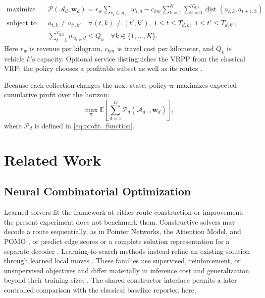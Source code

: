 \documentclass[orivec,runningheads]{llncs}
\DeclareMathOperator*{\dist}{dist}
\begin{document}
\begin{equation}
\begin{aligned}
    \textrm{maximize} \quad & \mathcal{P}(\mathcal{A}_d, \bm{w}_d) = r_w \sum_{v_i\in\mathcal{A}_{d,\cdot}}w_{i,d}
    -c_{km}\sum_{k=1}^{K}\sum_{t=0}^{T_{d,k}}
    \dist(a_{t,k},a_{t+1,k}) \label{eq:profit_function}\\
    \textrm{subject to} \quad
    & a_{t,k}\neq a_{t',k'} \quad
      \forall (t,k)\neq(t',k'),\ 1\leq t\leq T_{d,k},\ 1\leq t'\leq T_{d,k'},\\
    & \sum_{t=1}^{T_{d,k}}w_{a_{t,k},d}\leq Q_k
      \quad \forall k\in\{1,\ldots,K\}.
\end{aligned}
\end{equation}
Here $r_w$ is revenue per kilogram, $c_{km}$ is travel cost per kilometer, and $Q_k$ is vehicle $k$'s capacity. Optional service distinguishes the VRPP from
the classical VRP: the policy chooses a profitable subset as well as its routes \cite{doi:10.1137/1.9781611973594.ch10}.

Because each collection changes the next state, policy $\bm{\pi}$ maximizes
expected cumulative profit over the horizon:
\begin{equation}
    \max_{\bm{\pi}} \mathbb{E} \left[ \sum_{d=1}^D \mathcal{P}_d(\mathcal{A}_{d,\cdot}, \bm{w}_d) \right],
\end{equation}
where $\mathcal{P}_d$ is defined in \eqref{eq:profit_function}.



\section{Related Work}
\subsection{Neural Combinatorial Optimization}
Learned solvers fit the framework at either route construction or improvement;
the present experiment does not benchmark them. Constructive solvers may decode
a route sequentially, as in Pointer Networks, the Attention Model, and POMO
\cite{vinyals2015pointer,Kool2018AttentionLT,kwon2020pomo}, or predict edge
scores or a complete solution representation for a separate decoder
\cite{joshi2019efficient,karalias2020erdos,sun2023difusco}. Learning-to-search
methods instead refine an existing solution through learned local moves
\cite{ma2024learning}. These families use supervised, reinforcement, or
unsupervised objectives and differ materially in inference cost and
generalization beyond their training sizes
\cite{joshi2020learning,wu2024neural}. The shared constructor interface permits
a later controlled comparison with the classical baseline reported here.
\end{document}
